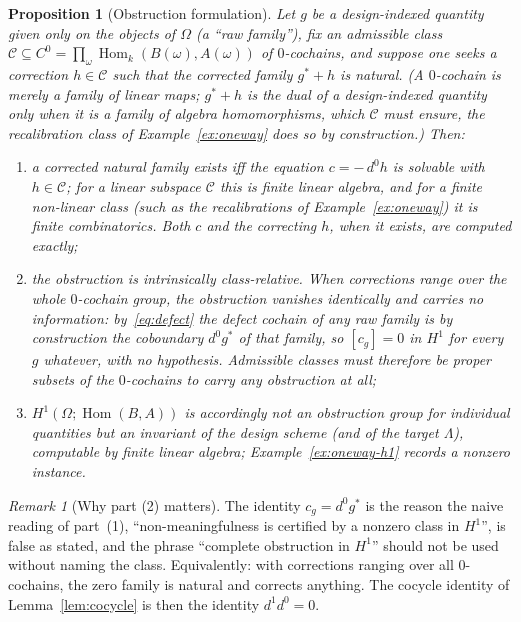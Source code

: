 \documentclass[11pt,a4paper]{article}
\theoremstyle{plain}
\newtheorem{proposition}[theorem]{Proposition}
\theoremstyle{definition}
\theoremstyle{remark}
\newtheorem{remark}[theorem]{Remark}
\newcommand{\cat}[1]{\mathsf{#1}}
\newcommand{\catO}{\cat{\Omega}}
\DeclareMathOperator{\Hom}{Hom}
\begin{document}
\begin{proposition}[Obstruction formulation]\label{wprop:obstruction}
Let $g$ be a design-indexed quantity given only on the objects of $\catO$
(a ``raw family''), fix an \emph{admissible class} $\mathcal{C} \subseteq
C^{0} = \prod_\omega \Hom_k(B(\omega),A(\omega))$ of $0$-cochains, and
suppose one seeks a correction $h \in \mathcal{C}$ such
that the corrected family $g^{*} + h$ is natural. (A $0$-cochain is merely a
family of linear maps; $g^{*}+h$ is the dual of a design-indexed quantity only
when it is a family of algebra homomorphisms, which $\mathcal{C}$ must ensure,
the recalibration class of Example~\ref{ex:oneway} does so by
construction.) Then:
\begin{enumerate}
\item a corrected natural family exists iff the equation $c = -\,d^{0}h$ is
solvable with $h \in \mathcal{C}$; for a linear subspace $\mathcal{C}$ this
is finite linear algebra, and for a finite non-linear class (such as the
recalibrations of Example~\ref{ex:oneway}) it is finite combinatorics. Both $c$
and the correcting $h$, when it exists, are computed exactly;
\item the obstruction is intrinsically \emph{class-relative}. When corrections
range over the whole $0$-cochain group, the obstruction vanishes identically and
carries no information: by~\eqref{eq:defect} the defect cochain of any raw
family is by construction the coboundary $d^{0}g^{*}$ of that family, so
$[c_g] = 0$ in $H^{1}$ for every $g$ whatever, with no hypothesis. Admissible
classes must therefore be \emph{proper} subsets of the $0$-cochains to carry
any obstruction at all;
\item $H^{1}(\catO;\Hom(B,A))$ is accordingly not an obstruction group for
individual quantities but an invariant of the design scheme (and of the
target $\Lambda$), computable by finite linear algebra;
Example~\ref{ex:oneway-h1} records a nonzero instance.
\end{enumerate}
\end{proposition}

\begin{remark}[Why part (2) matters]
The identity $c_g = d^{0}g^{*}$ is the reason the naive reading of part~(1),
``non-meaningfulness is certified by a nonzero class in $H^{1}$'', is
false as stated, and the phrase ``complete obstruction in $H^{1}$'' should not
be used without naming the class. Equivalently: with corrections ranging over
all $0$-cochains, the zero family is natural and corrects anything. The cocycle
identity of Lemma~\ref{lem:cocycle} is then the identity $d^{1}d^{0} = 0$.
\end{remark}
\end{document}
